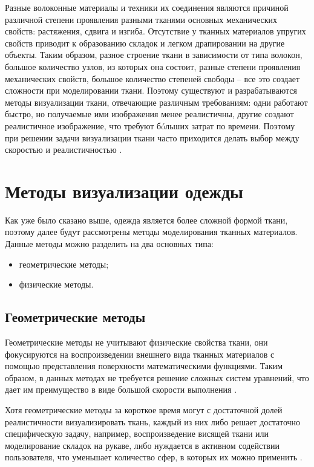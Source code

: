 Разные волоконные материалы и техники их соединения являются причиной различной
степени проявления разными тканями основных механических свойств: растяжения,
сдвига и изгиба. Отсутствие у тканных материалов упругих свойств приводит к
образованию складок и легком драпировании на другие объекты. Таким образом,
разное строение ткани в зависимости от типа волокон, большое количество узлов,
из которых она состоит, разные степени проявления механических свойств, большое
количество степеней свободы -- все это создает сложности при моделировании
ткани. Поэтому существуют и разрабатываются методы визуализации ткани,
отвечающие различным требованиям: одни работают быстро, но получаемые ими
изображения менее реалистичны, другие создают реалистичное изображение, что
требуют бóльших затрат по времени. Поэтому при решении задачи визуализации
ткани часто приходится делать выбор между скоростью и реалистичностью
\cite{bib11}.

\section{Методы визуализации одежды}

Как уже было сказано выше, одежда является более сложной формой ткани,
поэтому далее будут рассмотрены методы моделирования тканных материалов.
Данные методы можно разделить на два основных типа:
\begin{itemize}[left=\parindent]
    \item геометрические методы;
    \item физические методы.
\end{itemize}

\subsection{Геометрические методы}

Геометрические методы не учитывают физические свойства ткани, они фокусируются
на воспроизведении внешнего вида тканных материалов с помощью представления
поверхности математическими функциями. Таким образом, в данных методах не
требуется решение сложных систем уравнений, что дает им преимущество в виде
большой скорости выполнения \cite{bib07}.

Хотя геометрические методы за короткое время могут с достаточной долей
реалистичности визуализировать ткань, каждый из них либо решает достаточно
специфическую задачу, например, воспроизведение висящей ткани или моделирование
складок на рукаве, либо нуждается в активном содействии пользователя, что
уменьшает количество сфер, в которых их можно применить \cite{bib07}.

